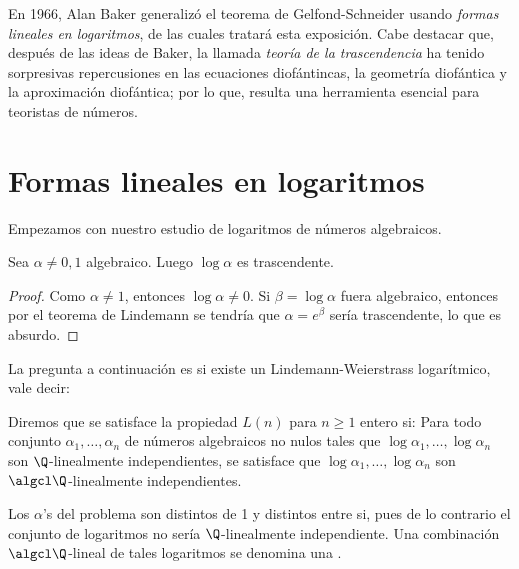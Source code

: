 \documentclass[11pt, reqno]{amsart}
\begin{document}
En 1966, Alan Baker generalizó el teorema de Gelfond-Schneider usando
\textit{formas lineales en logaritmos}, de las cuales tratará esta exposición.
Cabe destacar que, después de las ideas de Baker, la llamada \textit{teoría de
la trascendencia} ha tenido sorpresivas repercusiones en las ecuaciones
diofántincas, la geometría diofántica y la aproximación diofántica; por lo que,
resulta una herramienta esencial para teoristas de números.

\section{Formas lineales en logaritmos}
Empezamos con nuestro estudio de logaritmos de números algebraicos. 

\begin{prop}
	Sea $\alpha\neq 0,1$ algebraico. Luego $\log\alpha$ es trascendente. 
\end{prop}
\begin{proof}
	Como $\alpha\neq 1$, entonces $\log\alpha\neq 0$.
	Si $\beta=\log\alpha$ fuera algebraico, entonces por el teorema de Lindemann se tendría que $\alpha=e^{\beta}$ sería trascendente, lo que es absurdo.
\end{proof}

La pregunta a continuación es si existe un Lindemann-Weierstrass logarítmico, vale decir:
\begin{mydef}
	Diremos que se satisface la propiedad $L(n)$ para $n \ge 1$ entero si:
	Para todo conjunto $\alpha_1,\ldots,\alpha_n$ de números algebraicos no nulos
	tales que $\log\alpha_1,\ldots,\log\alpha_n$ son $\Q$-linealmente independientes,
	se satisface que $\log\alpha_1,\ldots,\log\alpha_n$ son $\algcl\Q$-linealmente independientes. 
\end{mydef}

\begin{obs}
	Los $\alpha$'s del problema son distintos de 1 y distintos entre si, pues de lo contrario el conjunto de logaritmos no sería $\Q$-linealmente independiente.
	Una combinación $\algcl\Q$-lineal de tales logaritmos se denomina una .
\end{obs}
\end{document}

